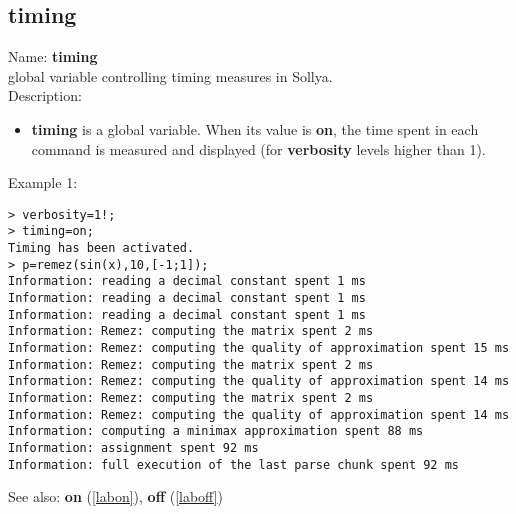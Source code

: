 \subsection{timing}
\label{labtiming}
\noindent Name: \textbf{timing}\\
global variable controlling timing measures in Sollya.\\

\noindent Description: \begin{itemize}

\item \textbf{timing} is a global variable. When its value is \textbf{on}, the time spent in each 
   command is measured and displayed (for \textbf{verbosity} levels higher than 1).
\end{itemize}
\noindent Example 1: 
\begin{center}\begin{minipage}{15cm}\begin{Verbatim}[frame=single]
> verbosity=1!;
> timing=on;
Timing has been activated.
> p=remez(sin(x),10,[-1;1]);
Information: reading a decimal constant spent 1 ms
Information: reading a decimal constant spent 1 ms
Information: reading a decimal constant spent 1 ms
Information: Remez: computing the matrix spent 2 ms
Information: Remez: computing the quality of approximation spent 15 ms
Information: Remez: computing the matrix spent 2 ms
Information: Remez: computing the quality of approximation spent 14 ms
Information: Remez: computing the matrix spent 2 ms
Information: Remez: computing the quality of approximation spent 14 ms
Information: computing a minimax approximation spent 88 ms
Information: assignment spent 92 ms
Information: full execution of the last parse chunk spent 92 ms
\end{Verbatim}
\end{minipage}\end{center}
See also: \textbf{on} (\ref{labon}), \textbf{off} (\ref{laboff})

